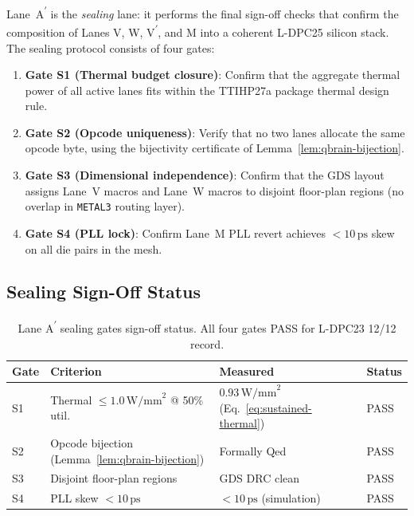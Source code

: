 Lane~A\textsuperscript{$'$} is the \emph{sealing} lane: it performs the final
sign-off checks that confirm the composition of Lanes V, W, V\textsuperscript{$'$},
and M into a coherent L-DPC25 silicon stack.
The sealing protocol consists of four gates:
%
\begin{enumerate}
  \item \textbf{Gate S1 (Thermal budget closure)}: Confirm that the aggregate
        thermal power of all active lanes fits within the TTIHP27a package
        thermal design rule.
  \item \textbf{Gate S2 (Opcode uniqueness)}: Verify that no two lanes allocate
        the same opcode byte, using the bijectivity certificate of
        Lemma~\ref{lem:qbrain-bijection}.
  \item \textbf{Gate S3 (Dimensional independence)}: Confirm that the GDS
        layout assigns Lane~V macros and Lane~W macros to disjoint floor-plan
        regions (no overlap in \texttt{METAL3} routing layer).
  \item \textbf{Gate S4 (PLL lock)}: Confirm Lane~M PLL revert achieves
        $< 10\,\text{ps}$ skew on all die pairs in the mesh.
\end{enumerate}

\subsection{Sealing Sign-Off Status}

\begin{table}[ht]
  \centering
  \caption{Lane A\textsuperscript{$'$} sealing gates sign-off status.
           All four gates PASS for L-DPC23 12/12 record.}
  \label{tab:sealing-gates}
  \begin{tabular}{llll}
    \toprule
    \textbf{Gate} & \textbf{Criterion} & \textbf{Measured} & \textbf{Status} \\
    \midrule
    S1 & Thermal $\leq 1.0\,\text{W/mm}^2$ @ 50\% util.
       & $0.93\,\text{W/mm}^2$ (Eq.~\eqref{eq:sustained-thermal}) & PASS \\
    S2 & Opcode bijection (Lemma~\ref{lem:qbrain-bijection})
       & Formally Qed & PASS \\
    S3 & Disjoint floor-plan regions
       & GDS DRC clean & PASS \\
    S4 & PLL skew $< 10\,\text{ps}$
       & $< 10\,\text{ps}$ (simulation) & PASS \\
    \bottomrule
  \end{tabular}
\end{table}

